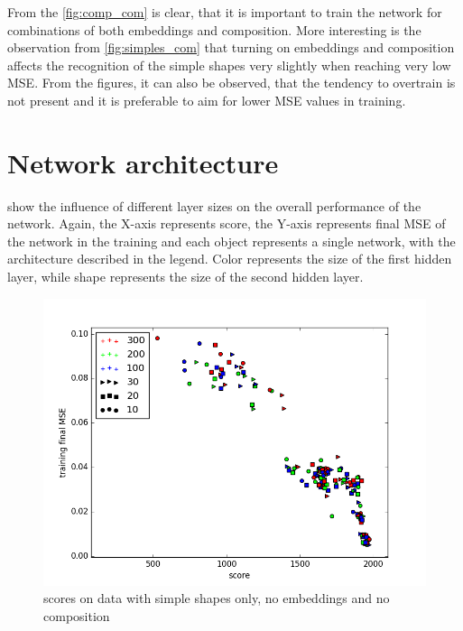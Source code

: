 From the \cref{fig:comp_com}  is clear, that it is important to train the network for combinations of both embeddings and composition. More interesting is the observation from \cref{fig:simples_com} that turning on embeddings and composition affects the recognition of the simple shapes very slightly when reaching very low MSE. From the figures, it can also be observed, that the tendency to overtrain is not present and it is preferable to aim for lower MSE values in training.

\section{Network architecture}
  show the influence of different layer sizes on the overall performance of the network. Again, the X-axis represents score, the Y-axis represents final MSE of the network in the training and each object represents a single network, with the architecture described in the legend. Color represents the size of the first hidden layer, while shape represents the size of the second hidden layer.

\begin{figure}
\centering
\includegraphics[width=.8\linewidth]{ext/figure_simples_arch.png}
\caption{scores on data with simple shapes only, no embeddings and no composition}
\label{fig:simples_arch}
\end{figure}

